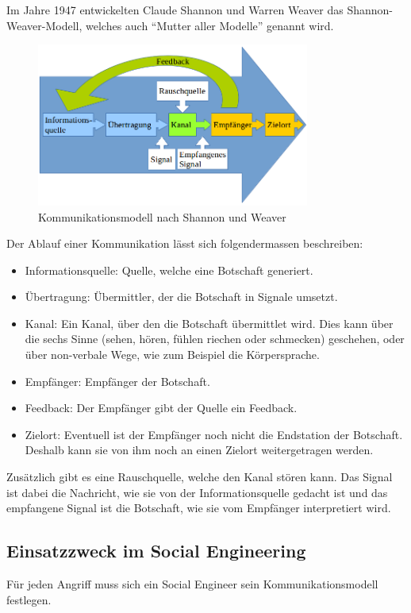 Im Jahre 1947 entwickelten Claude Shannon und Warren Weaver das Shannon-Weaver-Modell, welches auch "`Mutter aller Modelle"' genannt wird.

\begin{figure}[H]
  \centering
  \includegraphics[width=0.8\textwidth]{images/shannon-weaver-model.png}
  \caption[Test image for television]{Kommunikationsmodell nach Shannon und Weaver}
  \label{fig:socialengineering:Kommunikation:Kommunikationsmodell:shannon-weaver-model}
\end{figure}

Der Ablauf einer Kommunikation lässt sich folgendermassen beschreiben:
\begin{itemize}
\item Informationsquelle: Quelle, welche eine Botschaft generiert.
\item Übertragung: Übermittler, der die Botschaft in Signale umsetzt.
\item Kanal: Ein Kanal, über den die Botschaft übermittlet wird. Dies kann über die sechs Sinne (sehen, hören, fühlen riechen oder schmecken) geschehen, oder über non-verbale Wege, wie zum Beispiel die Körpersprache.
\item Empfänger: Empfänger der Botschaft.
\item Feedback: Der Empfänger gibt der Quelle ein Feedback.
\item Zielort: Eventuell ist der Empfänger noch nicht die Endstation der Botschaft. Deshalb kann sie von ihm noch an einen Zielort weitergetragen werden.
\end{itemize}
Zusätzlich gibt es eine Rauschquelle, welche den Kanal stören kann. Das Signal ist dabei die Nachricht, wie sie von der Informationsquelle gedacht ist und das empfangene Signal ist die Botschaft, wie sie vom Empfänger interpretiert wird.

\subsection{Einsatzzweck im Social Engineering}
Für jeden Angriff muss sich ein Social Engineer sein Kommunikationsmodell festlegen. 

